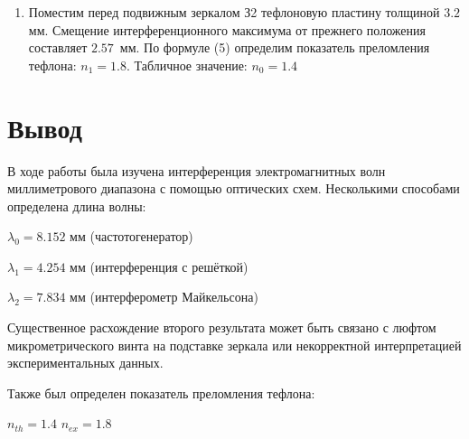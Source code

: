 \documentclass[a4paper, 12pt]{article}
\begin{document}
\begin{enumerate}
    \item Поместим перед подвижным зеркалом З2 тефлоновую пластину толщиной $3.2$ мм. Смещение интерференционного максимума от прежнего положения составляет $2.57$~мм. По формуле (5) определим показатель преломления тефлона: $n_1 = 1.8$. Табличное значение: $n_0 = 1.4$
\end{enumerate}

\newpage

\section{Вывод}

В ходе работы была изучена интерференция электромагнитных волн миллиметрового диапазона с помощью оптических схем. Несколькими способами определена длина волны:
\begin{center}
    $\lambda_0 = 8.152$ мм (частотогенератор) \par
    $\lambda_1 = 4.254$ мм (интерференция с решёткой) \par
    $\lambda_2 = 7.834$ мм (интерферометр Майкельсона) 
\end{center}
Существенное расхождение второго результата может быть связано с люфтом микрометрического винта на подставке зеркала или некорректной интерпретацией экспериментальных данных.

Также был определен показатель преломления тефлона:
\begin{center}
    $n_{th} = 1.4$ \hspace{1cm} $n_{ex} = 1.8$
\end{center}
\end{document}
